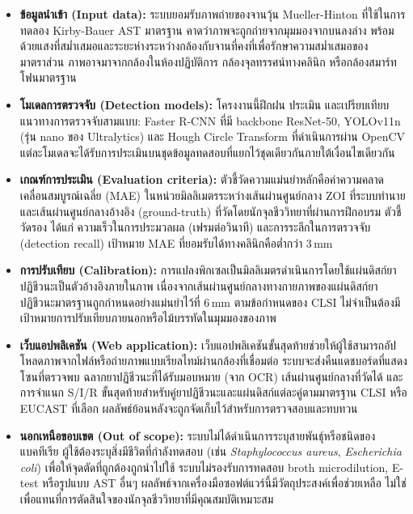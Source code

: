 \begin{itemize}
  \item \textbf{ข้อมูลนำเข้า (Input data):} ระบบยอมรับภาพถ่ายของจานวุ้น Mueller-Hinton ที่ใช้ในการทดลอง Kirby-Bauer AST มาตรฐาน คาดว่าภาพจะถูกถ่ายจากมุมมองจากบนลงล่าง พร้อมด้วยแสงที่สม่ำเสมอและระยะห่างระหว่างกล้องกับจานที่คงที่เพื่อรักษาความสม่ำเสมอของมาตราส่วน ภาพอาจมาจากกล้องในห้องปฏิบัติการ กล้องจุลทรรศน์ทางคลินิก หรือกล้องสมาร์ทโฟนมาตรฐาน

  \item \textbf{โมเดลการตรวจจับ (Detection models):} โครงงานนี้ฝึกฝน ประเมิน และเปรียบเทียบแนวทางการตรวจจับสามแบบ: Faster R-CNN ที่มี backbone ResNet-50, YOLOv11n (รุ่น nano ของ Ultralytics) และ Hough Circle Transform ที่ดำเนินการผ่าน OpenCV แต่ละโมเดลจะได้รับการประเมินบนชุดข้อมูลทดสอบที่แยกไว้ชุดเดียวกันภายใต้เงื่อนไขเดียวกัน

  \item \textbf{เกณฑ์การประเมิน (Evaluation criteria):} ตัวชี้วัดความแม่นยำหลักคือค่าความคลาดเคลื่อนสมบูรณ์เฉลี่ย (MAE) ในหน่วยมิลลิเมตรระหว่างเส้นผ่านศูนย์กลาง ZOI ที่ระบบทำนายและเส้นผ่านศูนย์กลางอ้างอิง (ground-truth) ที่วัดโดยนักจุลชีววิทยาที่ผ่านการฝึกอบรม ตัวชี้วัดรอง ได้แก่ ความเร็วในการประมวลผล (เฟรมต่อวินาที) และการระลึกในการตรวจจับ (detection recall) เป้าหมาย MAE ที่ยอมรับได้ทางคลินิกคือต่ำกว่า 3\,mm

  \item \textbf{การปรับเทียบ (Calibration):} การแปลงพิกเซลเป็นมิลลิเมตรดำเนินการโดยใช้แผ่นดิสก์ยาปฏิชีวนะเป็นตัวอ้างอิงภายในภาพ เนื่องจากเส้นผ่านศูนย์กลางทางกายภาพของแผ่นดิสก์ยาปฏิชีวนะมาตรฐานถูกกำหนดอย่างแม่นยำไว้ที่ 6\,mm ตามข้อกำหนดของ CLSI ไม่จำเป็นต้องมีเป้าหมายการปรับเทียบภายนอกหรือไม้บรรทัดในมุมมองของภาพ

  \item \textbf{เว็บแอปพลิเคชัน (Web application):} เว็บแอปพลิเคชันขั้นสุดท้ายช่วยให้ผู้ใช้สามารถอัปโหลดภาพจากไฟล์หรือถ่ายภาพแบบเรียลไทม์ผ่านกล้องที่เชื่อมต่อ ระบบจะส่งคืนแดชบอร์ดที่แสดงโซนที่ตรวจพบ ฉลากยาปฏิชีวนะที่ได้รับมอบหมาย (จาก OCR) เส้นผ่านศูนย์กลางที่วัดได้ และการจำแนก S/I/R ขั้นสุดท้ายสำหรับคู่ยาปฏิชีวนะและแผ่นดิสก์แต่ละคู่ตามมาตรฐาน CLSI หรือ EUCAST ที่เลือก ผลลัพธ์ย้อนหลังจะถูกจัดเก็บไว้สำหรับการตรวจสอบและทบทวน

  \item \textbf{นอกเหนือขอบเขต (Out of scope):} ระบบไม่ได้ดำเนินการระบุสายพันธุ์หรือชนิดของแบคทีเรีย ผู้ใช้ต้องระบุสิ่งมีชีวิตที่กำลังทดสอบ (เช่น \textit{Staphylococcus aureus}, \textit{Escherichia coli}) เพื่อให้จุดตัดที่ถูกต้องถูกนำไปใช้ ระบบไม่รองรับการทดสอบ broth microdilution, E-test หรือรูปแบบ AST อื่นๆ ผลลัพธ์จากเครื่องมือซอฟต์แวร์นี้มีวัตถุประสงค์เพื่อช่วยเหลือ ไม่ใช่เพื่อแทนที่การตัดสินใจของนักจุลชีววิทยาที่มีคุณสมบัติเหมาะสม
\end{itemize}


